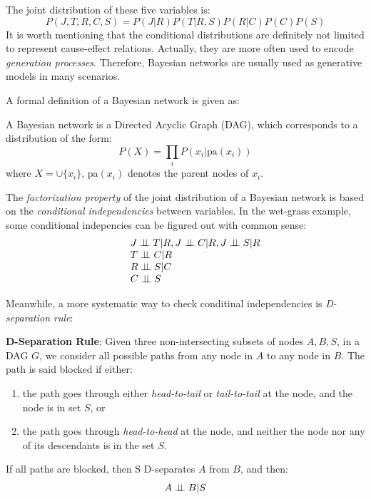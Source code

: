 The joint distribution of these five variables is:
\begin{equation}
	P(J,T,R,C,S)=P(J|R)P(T|R,S)P(R|C)P(C)P(S)
	\label{equ:wet_grass}
\end{equation}
It is worth mentioning that the conditional distributions are definitely not limited to represent cause-effect relations.  
Actually, they are more often used to encode \emph{generation processes}. Therefore, Bayesian networks are usually 
used as generative models in many scenarios.  

A formal definition of a Bayesian network is given as:  
\begin{definition}
 A Bayesian network is a Directed Acyclic Graph (DAG), which corresponds to a distribution of the form:
 \begin{equation}
  P(X)=\prod_i P(x_i|\text{pa}(x_i))
 \end{equation}
where $X=\cup\{x_i\}$, pa$(x_i)$ denotes the parent nodes of $x_i$. 
\end{definition}

The \emph{factorization property} of the joint distribution of a Bayesian network is based on the \emph{conditional independencies} between variables. In the wet-grass example, some conditional 
indepencies can be figured out with common sense:
\begin{equation*}
\begin{array}{rcl}
 &&J\ci T|R, J\ci C|R, J\ci S|R\\
 &&T\ci C|R \\
 &&R\ci S|C \\
 &&C\ci S 
\end{array}
\end{equation*}
 

Meanwhile, a more systematic way to check conditinal independencies is \emph{D-separation rule}:   
\begin{theorem}
\textbf{D-Separation Rule}:
 Given three non-intersecting subsets of nodes $A,B,S$, in a DAG $G$, we consider all possible paths from any node in $A$ to any node in $B$. The path 
is said blocked if either: 
\begin{enumerate}
 \item the path goes through either \emph{head-to-tail} or \emph{tail-to-tail} at the node, and the node is in set $S$, or
 \item the path goes through \emph{head-to-head} at the node, and neither the node nor any of its descendants is in the set $S$. 
\end{enumerate}
If all paths are blocked, then S D-separates $A$ from $B$, and then:
\begin{equation*}
 A\perp\!\!\!\perp B|S
\end{equation*}
\end{theorem}


